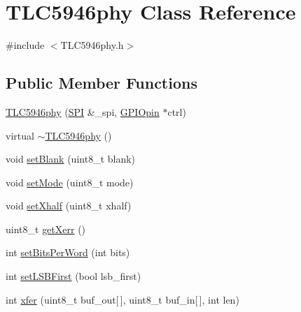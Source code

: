 \hypertarget{class_t_l_c5946phy}{\section{T\-L\-C5946phy Class Reference}
\label{class_t_l_c5946phy}
}


{\ttfamily \#include $<$T\-L\-C5946phy.\-h$>$}

\subsection*{Public Member Functions}
\begin{DoxyCompactItemize}
\item 
\hyperlink{class_t_l_c5946phy_a2c3d69df1f7a9fa396c9378a201706a2}{T\-L\-C5946phy} (\hyperlink{class_s_p_i}{S\-P\-I} \&\-\_\-spi, \hyperlink{class_g_p_i_opin}{G\-P\-I\-Opin} $\ast$ctrl)
\item 
virtual \hyperlink{class_t_l_c5946phy_a7ed74634384c99c3b305e0c33d9ec47b}{$\sim$\-T\-L\-C5946phy} ()
\item 
void \hyperlink{class_t_l_c5946phy_a917d05cee794f633a6775b8c509efba0}{set\-Blank} (uint8\-\_\-t blank)
\item 
void \hyperlink{class_t_l_c5946phy_a43974eb64479ebd593ea122e5f446ffa}{set\-Mode} (uint8\-\_\-t mode)
\item 
void \hyperlink{class_t_l_c5946phy_a11b29859983d81add34d6fb0721613a2}{set\-Xhalf} (uint8\-\_\-t xhalf)
\item 
uint8\-\_\-t \hyperlink{class_t_l_c5946phy_ac57ced207378247e87f025e3cb94d754}{get\-Xerr} ()
\item 
int \hyperlink{class_t_l_c5946phy_a0604df91a14451f72504f39cd379eed1}{set\-Bits\-Per\-Word} (int bits)
\item 
int \hyperlink{class_t_l_c5946phy_a7f12198f25476c730e6838cfcd94c388}{set\-L\-S\-B\-First} (bool lsb\-\_\-first)
\item 
int \hyperlink{class_t_l_c5946phy_a142002ef92f3bb22579e63b9110e6a30}{xfer} (uint8\-\_\-t buf\-\_\-out\mbox{[}$\,$\mbox{]}, uint8\-\_\-t buf\-\_\-in\mbox{[}$\,$\mbox{]}, int len)
\end{DoxyCompactItemize}


